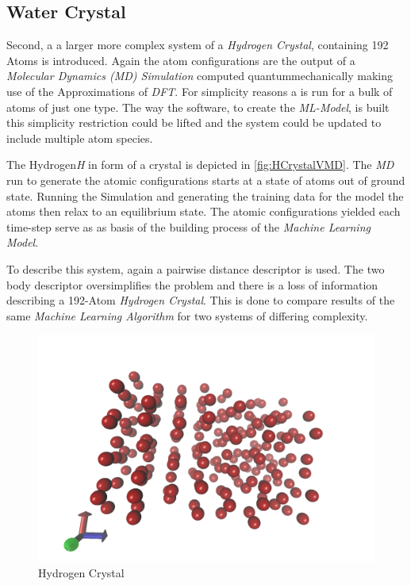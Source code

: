 \subsection{Water Crystal}
\label{subsection:4.1.2}
Second, a a larger more complex system of a \textit{Hydrogen Crystal}, containing 192 Atoms is introduced. Again the atom configurations are the output of a \textit{Molecular Dynamics (MD) Simulation} computed quantummechanically making use of the Approximations of \textit{DFT}. For simplicity reasons a  is run for a bulk of atoms of just one type. The way the software, to create the \textit{ML-Model}, is built this  simplicity restriction could be lifted and the system could be updated to include multiple atom species.

The Hydrogen\textit{H} in form of a crystal is depicted in \ref{fig:HCrystalVMD}. The \textit{MD} run to generate the atomic configurations starts at a state of atoms out of ground state. Running the Simulation and generating the training data for the model the atoms then relax to an equilibrium state. The atomic configurations yielded each time-step serve as as basis of the building process of the \textit{Machine Learning Model}.  

To describe this system, again a pairwise distance descriptor is used. The two body descriptor oversimplifies the problem and there is a loss of information describing a 192-Atom \textit{Hydrogen Crystal}. This is done to compare results of the same \textit{Machine Learning Algorithm} for two systems of differing complexity. 

\begin{figure}
	\includegraphics{../Bilder/Hydrogen_Crystal_Fig1.png}
	\caption{Hydrogen Crystal}
	\label{HCrystalVMD}
\end{figure}



